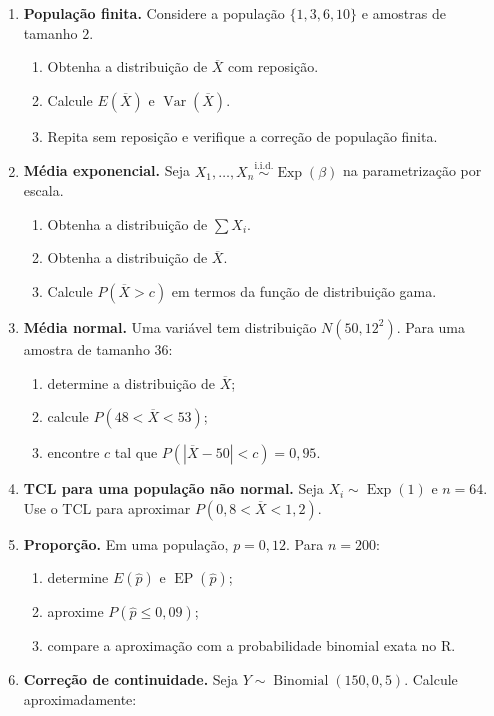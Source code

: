 \documentclass[
  letterpaper,
  DIV=11,
  numbers=noendperiod]{scrreprt}
\begin{document}
\begin{enumerate}
\def\labelenumi{\arabic{enumi}.}
\setcounter{enumi}{5}
\item
  \textbf{População finita.} Considere a população \(\{1,3,6,10\}\) e
  amostras de tamanho \(2\).

  \begin{enumerate}
  \def\labelenumii{\alph{enumii}.}
  \item
    Obtenha a distribuição de \(\overline{X}\) com reposição.
  \item
    Calcule \(E(\overline{X})\) e \(\operatorname{Var}(\overline{X})\).
  \item
    Repita sem reposição e verifique a correção de população finita.
  \end{enumerate}
\item
  \textbf{Média exponencial.} Seja
  \(X_1,\ldots,X_n\overset{\mathrm{i.i.d.}}{\sim}\operatorname{Exp}(\beta)\)
  na parametrização por escala.

  \begin{enumerate}
  \def\labelenumii{\alph{enumii}.}
  \item
    Obtenha a distribuição de \(\sum X_i\).
  \item
    Obtenha a distribuição de \(\overline{X}\).
  \item
    Calcule \(P(\overline{X}>c)\) em termos da função de distribuição
    gama.
  \end{enumerate}
\item
  \textbf{Média normal.} Uma variável tem distribuição \(N(50,12^2)\).
  Para uma amostra de tamanho \(36\):

  \begin{enumerate}
  \def\labelenumii{\alph{enumii}.}
  \item
    determine a distribuição de \(\overline{X}\);
  \item
    calcule \(P(48<\overline{X}<53)\);
  \item
    encontre \(c\) tal que \(P(|\overline{X}-50|<c)=0{,}95\).
  \end{enumerate}
\item
  \textbf{TCL para uma população não normal.} Seja
  \(X_i\sim\operatorname{Exp}(1)\) e \(n=64\). Use o TCL para aproximar
  \(P(0{,}8<\overline{X}<1{,}2)\).
\item
  \textbf{Proporção.} Em uma população, \(p=0{,}12\). Para \(n=200\):

  \begin{enumerate}
  \def\labelenumii{\alph{enumii}.}
  \item
    determine \(E(\widehat p)\) e \(\operatorname{EP}(\widehat p)\);
  \item
    aproxime \(P(\widehat p\leq0{,}09)\);
  \item
    compare a aproximação com a probabilidade binomial exata no R.
  \end{enumerate}
\item
  \textbf{Correção de continuidade.} Seja
  \(Y\sim\operatorname{Binomial}(150,0{,}5)\). Calcule aproximadamente:


\end{enumerate}
\end{document}
